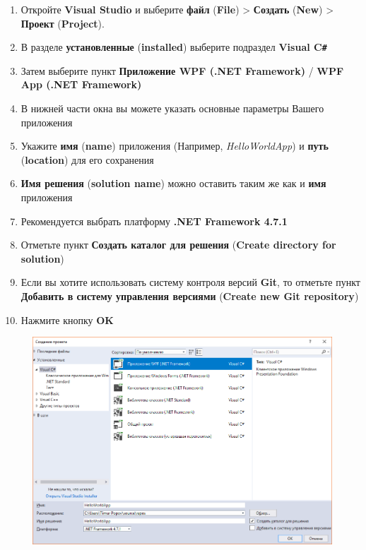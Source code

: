 \begin{enumerate}
    \item Откройте \textbf{Visual Studio} и выберите \textbf{файл} (\textbf{File}) > \textbf{Создать} (\textbf{New}) > \textbf{Проект} (\textbf{Project}).
    \item В разделе \textbf{установленные} (\textbf{installed}) выберите подраздел \textbf{Visual C\texttt{\#}}
    \item Затем выберите пункт \textbf{Приложение WPF (.NET Framework)} / \textbf{WPF App (.NET Framework)}
    \item В нижней части окна вы можете указать основные параметры Вашего приложения
    \item Укажите \textbf{имя} (\textbf{name}) приложения (Например, \textit{HelloWorldApp}) и \textbf{путь} (\textbf{location}) для его сохранения
    \item \textbf{Имя решения} (\textbf{solution name}) можно оставить таким же как и \textbf{имя} приложения
    \item Рекомендуется выбрать платформу \textbf{.NET Framework 4.7.1}
    \item Отметьте пункт \textbf{Создать каталог для решения} (\textbf{Create directory for solution})
    \item Если вы хотите использовать систему контроля версий \textbf{Git}, то отметьте пункт \textbf{Добавить в систему управления версиями} (\textbf{Create new Git repository})
    \item Нажмите кнопку \textbf{OK}
\end{enumerate}

\begin{figure}[H]
\centering
\includegraphics[width=1\textwidth]{introduction_create_project.png}
\end{figure}

